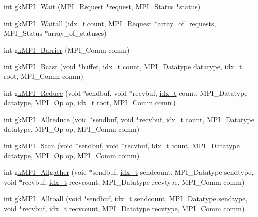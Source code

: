 \begin{DoxyCompactItemize}
\item 
int \hyperlink{a00359_a878d900addb2e537070c9892cc37dde0}{gk\+M\+P\+I\+\_\+\+Wait} (M\+P\+I\+\_\+\+Request $\ast$request, M\+P\+I\+\_\+\+Status $\ast$status)
\item 
int \hyperlink{a00359_a8fb70b0ee91eb5e31adfdf681c67c31f}{gk\+M\+P\+I\+\_\+\+Waitall} (\hyperlink{a00876_aaa5262be3e700770163401acb0150f52}{idx\+\_\+t} count, M\+P\+I\+\_\+\+Request $\ast$array\+\_\+of\+\_\+requests, M\+P\+I\+\_\+\+Status $\ast$array\+\_\+of\+\_\+statuses)
\item 
int \hyperlink{a00359_a1edf33502a17ee84cb573dc0bd989bda}{gk\+M\+P\+I\+\_\+\+Barrier} (M\+P\+I\+\_\+\+Comm comm)
\item 
int \hyperlink{a00359_a22d90d341b85ea6b900bae0a5f9a8b71}{gk\+M\+P\+I\+\_\+\+Bcast} (void $\ast$buffer, \hyperlink{a00876_aaa5262be3e700770163401acb0150f52}{idx\+\_\+t} count, M\+P\+I\+\_\+\+Datatype datatype, \hyperlink{a00876_aaa5262be3e700770163401acb0150f52}{idx\+\_\+t} root, M\+P\+I\+\_\+\+Comm comm)
\item 
int \hyperlink{a00359_ad629e734a85de207a3a6b5b84d6df7e0}{gk\+M\+P\+I\+\_\+\+Reduce} (void $\ast$sendbuf, void $\ast$recvbuf, \hyperlink{a00876_aaa5262be3e700770163401acb0150f52}{idx\+\_\+t} count, M\+P\+I\+\_\+\+Datatype datatype, M\+P\+I\+\_\+\+Op op, \hyperlink{a00876_aaa5262be3e700770163401acb0150f52}{idx\+\_\+t} root, M\+P\+I\+\_\+\+Comm comm)
\item 
int \hyperlink{a00359_a192aab5cebcfc29f208341fec3f8fd3a}{gk\+M\+P\+I\+\_\+\+Allreduce} (void $\ast$sendbuf, void $\ast$recvbuf, \hyperlink{a00876_aaa5262be3e700770163401acb0150f52}{idx\+\_\+t} count, M\+P\+I\+\_\+\+Datatype datatype, M\+P\+I\+\_\+\+Op op, M\+P\+I\+\_\+\+Comm comm)
\item 
int \hyperlink{a00359_a8f9cc3ccf10cef3753659c596da87bb3}{gk\+M\+P\+I\+\_\+\+Scan} (void $\ast$sendbuf, void $\ast$recvbuf, \hyperlink{a00876_aaa5262be3e700770163401acb0150f52}{idx\+\_\+t} count, M\+P\+I\+\_\+\+Datatype datatype, M\+P\+I\+\_\+\+Op op, M\+P\+I\+\_\+\+Comm comm)
\item 
int \hyperlink{a00359_a0b7a139ad6fb30c1ae40ac2b57188f1a}{gk\+M\+P\+I\+\_\+\+Allgather} (void $\ast$sendbuf, \hyperlink{a00876_aaa5262be3e700770163401acb0150f52}{idx\+\_\+t} sendcount, M\+P\+I\+\_\+\+Datatype sendtype, void $\ast$recvbuf, \hyperlink{a00876_aaa5262be3e700770163401acb0150f52}{idx\+\_\+t} recvcount, M\+P\+I\+\_\+\+Datatype recvtype, M\+P\+I\+\_\+\+Comm comm)
\item 
int \hyperlink{a00359_a6ebc719035504ecc821d960bcbbd1d4c}{gk\+M\+P\+I\+\_\+\+Alltoall} (void $\ast$sendbuf, \hyperlink{a00876_aaa5262be3e700770163401acb0150f52}{idx\+\_\+t} sendcount, M\+P\+I\+\_\+\+Datatype sendtype, void $\ast$recvbuf, \hyperlink{a00876_aaa5262be3e700770163401acb0150f52}{idx\+\_\+t} recvcount, M\+P\+I\+\_\+\+Datatype recvtype, M\+P\+I\+\_\+\+Comm comm)

\end{DoxyCompactItemize}
